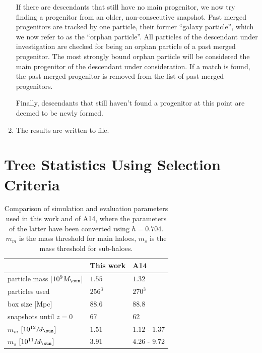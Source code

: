 \begin{enumerate}
		If there are descendants that still have no main progenitor, we now try finding a progenitor from an older, non-consecutive snapshot.
		Past merged progenitors are tracked by one particle, their former ``galaxy particle'', which we now refer to as the ``orphan particle''.
		All particles of the descendant under investigation are checked for being an orphan particle of a past merged progenitor.
		The most strongly bound orphan particle will be considered the main progenitor of the descendant under consideration.
		If a match is found, the past merged progenitor is removed from the list of past merged progenitors.
		
		Finally, descendants that still haven't found a progenitor at this point are deemed to be newly formed.
		
	\item The results are written to file.
	
	

	
\end{enumerate}

















\section{Tree Statistics Using \citet{SUSSING_HALOFINDER} Selection Criteria}\label{app:performance_comparison}



\begin{table}
\centering
\caption{
	Comparison of simulation and evaluation parameters used in this work and of A14, where the parameters of the latter have been converted using $h = 0.704$.
	$m_m$ is the mass threshold for main haloes, $m_s$ is the mass threshold for sub-haloes.
	\label{tab:parameter-comparison}
}
	\begin{tabular}[c]{l l l}
													&	This work		&	A14 \\
		\hline
		particle mass	[$10^9 \msol$]				&	$1.55$			& $1.32$						\\
		particles used								& 	$256^3$			& $270^3$ 						\\
		box size [Mpc]								& 	$88.6$			& $88.8$						\\
		snapshots until $z = 0$						&  	67				& 62							\\				
		$m_m$ [$10^{12} \msol$]						&	$1.51$			& $1.12$ - $1.37$				\\
		$m_s$ [$10^{11} \msol$]						&	$3.91$			& $4.26$ - $9.72$				\\
		\hline
	\end{tabular}
\end{table}


